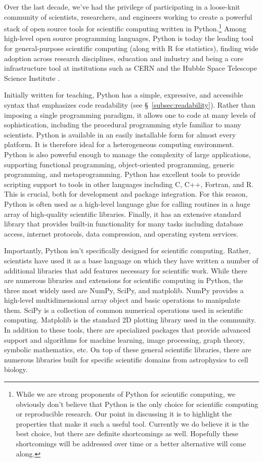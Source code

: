 \documentclass[ChapterTOCs,krantz2]{krantz} %
\begin{document}
Over the last decade, we've had the privilege of participating in a loose-knit
community of scientists, researchers, and engineers working to create a powerful
stack of open source tools for scientific computing written in Python.\footnote{While
  we are strong proponents of Python for scientific computing, we obviously don't
  believe that Python is the only choice for scientific computing or reproducible
  research. Our point in discussing it is to highlight the properties that make
  it such a useful tool. Currently we do believe it is the best choice, but there
  are definite shortcomings as well.  Hopefully these shortcomings will be addressed
  over time or a better alternative will come along.}  Among
high-level open source programming languages, Python is today the leading tool
for general-purpose scientific computing (along with R for statistics),
finding wide adoption across research disciplines, education and industry and
being a core infrastructure tool at institutions such as CERN and the Hubble
Space Telescope Science Institute
\cite{millman2011python,Perez2011,ganga09,SST}.

Initially written for teaching, Python has a simple, expressive, and accessible
syntax that emphasizes code readability (see §~\ref{subsec:readability}).
Rather than imposing a single programming paradigm, it allows one to code at
many levels of sophistication, including the procedural programming style
familiar to many scientists. Python is available in an easily installable form
for almost every platform. It is therefore ideal for a heterogeneous computing
environment. Python is also powerful enough to manage the complexity of large
applications, supporting functional programming, object-oriented programming,
generic programming, and metaprogramming.  Python has excellent tools to
provide scripting support to tools in other languages including C, C++,
Fortran, and R. This is crucial, both for development and package integration.
For this reason, Python is often used as a high-level language glue for calling
routines in a huge array of high-quality scientific libraries. Finally, it
has an extensive standard library that provides built-in functionality for
many tasks including database access, internet protocols, data compression,
and operating system services.

Importantly, Python isn't specifically designed for scientific computing.
Rather, scientists have used it as a base language on which they have written a
number of additional libraries that add features necessary for scientific work.
While there are numerous libraries and extensions for scientific computing in
Python, the three most widely used are NumPy, SciPy, and matplolib.  NumPy
provides a high-level multidimensional array object and basic operations to
manipulate them. SciPy is a collection of common numerical operations used in
scientific computing. Matplolib is the standard 2D plotting library used in the
community. In addition to these tools, there are specialized packages that
provide advanced support and algorithms for machine learning, image processing,
graph theory, symbolic mathematics, etc. On top of these general scientific
libraries, there are numerous libraries built for specific scientific domains
from astrophysics to cell biology.
\end{document}
